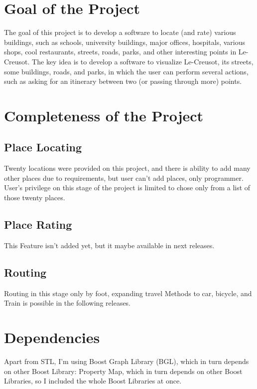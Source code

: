 \documentclass[a4paper,english]{book}
\begin{document}
\section{Goal of the Project}
The goal of this project is to develop a software to locate (and rate) various buildings, such as schools, university buildings, major offices, hospitals, various shops, cool restaurants, streets, roads, parks, and other interesting points in Le-Creusot.
The key idea is to develop a software to visualize Le-Creusot, its streets, some
buildings, roads, and parks, in which the user can perform several actions, such as asking for an itinerary between two (or passing through more) points.
\section{Completeness of the Project}
\subsection{Place Locating}
Twenty locations were provided on this project, and there is ability to add many other places due to requirements, but user can't add places, only programmer.
User's privilege on this stage of the project is limited to chose only from a list of those twenty places.
\subsection{Place Rating}
This Feature isn't added yet, but it maybe available in next releases.
\subsection{Routing}
Routing in this stage only by foot, expanding travel Methods to car, bicycle, and Train is possible in the following releases. 
\section{Dependencies}
Apart from STL, I’m using Boost Graph Library (BGL), which in turn depends on other Boost Library: Property Map, which in turn depends on other Boost Libraries, so I included the whole Boost Libraries at once.
\end{document}
